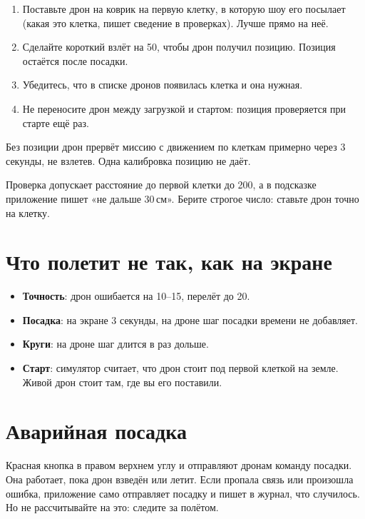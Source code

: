\begin{enumerate}
  \item Поставьте дрон на коврик на первую клетку, в которую шоу его посылает (какая это клетка, пишет сведение в проверках). Лучше прямо на неё.
  \item Сделайте короткий взлёт на 50\cm, чтобы дрон получил позицию. Позиция остаётся после посадки.
  \item Убедитесь, что в списке дронов появилась клетка и она нужная.
  \item Не переносите дрон между загрузкой и стартом: позиция проверяется при старте ещё раз.
\end{enumerate}

Без позиции дрон прервёт миссию с движением по клеткам примерно через 3 секунды, не взлетев. Одна калибровка позицию не даёт.

\begin{vnimanie}
Проверка допускает расстояние до первой клетки до 200\cm, а в подсказке приложение пишет «не дальше 30\,см». Берите строгое число: ставьте дрон точно на клетку.
\end{vnimanie}

\section{Что полетит не так, как на экране}

\begin{itemize}
  \item \textbf{Точность}: дрон ошибается на 10--15\cm, перелёт до 20\cm.
  \item \textbf{Посадка}: на экране 3 секунды, на дроне шаг посадки времени не добавляет.
  \item \textbf{Круги}: на дроне шаг  длится в  раз дольше.
  \item \textbf{Старт}: симулятор считает, что дрон стоит под первой клеткой на земле. Живой дрон стоит там, где вы его поставили.
\end{itemize}

\section{Аварийная посадка}

Красная кнопка в правом верхнем углу и  отправляют дронам команду посадки. Она работает, пока дрон взведён или летит. Если пропала связь или произошла ошибка, приложение само отправляет посадку и пишет в журнал, что случилось. Но не рассчитывайте на это: следите за полётом.
